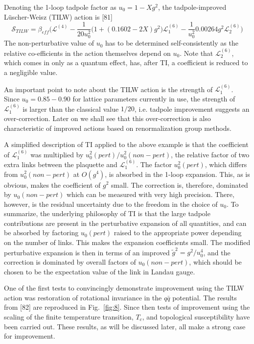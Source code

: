 Denoting the 1-loop tadpole factor as $u_0 = 1 - Xg^2$, the
tadpole-improved L\"uscher-Weisz (TILW) action is [81]
\begin{equation}
\mathcal{S}_{TILW} = \beta_{eff}\bigg(\mathcal{L}^{(4)}
    - \frac{1}{20u_0^2}\big(1 + (0.1602-2X)g^2\big)\mathcal{L}_1^{(6)}
    - \frac{1}{u_0^2}0.00264g^2\mathcal{L}_2^{(6)}\bigg)
\label{eq:LWTIaction}
\end{equation}
The non-perturbative value of $u_0$ has to be determined
self-consistently as the relative co-efficients in the action
themselves depend on $u_0$.  Note that $\mathcal{L}_2^{(6)}$, which
comes in only as a quantum effect, has, after TI, a coefficient is
reduced to a negligible value.

An important point to note about the TILW action is the strength of
$\mathcal{L}_1^{(6)}$.  Since $u_0 = 0.85-0.90$ for lattice parameters
currently in use, the strength of $\mathcal{L}_1^{(6)}$ is larger than
the classical value $1/20$, i.e. tadpole improvement suggests an
over-correction.  Later on we shall see that this over-correction is
also characteristic of improved actions based on renormalization group
methods.

A simplified description of TI applied to the above example is that the
coefficient of $\mathcal{L}_1^{(6)}$ was multiplied by
$u_0^2(pert)/u_0^2(non-pert)$, the relative factor of two extra links
between the plaquette and $\mathcal{L}_1^{(6)}$.  The factor
$u_0^2(pert)$, which differs from $u_0^2(non-pert)$ at $O(g^4)$, is
absorbed in the 1-loop expansion.  This, as is obvious, makes the
coefficient of $g^2$ small.  The correction is, therefore, dominated by
$u_0(non-pert)$ which can be measured with very high precision.  There,
however, is the residual uncertainty due to the freedom in the choice of
$u_0$.  To summarize, the underlying philosophy of TI is that the large
tadpole contributions are present in the perturbative expansion of all
quantities, and can be absorbed by factoring $u_0(pert)$ raised to the
appropriate power depending on the number of links.  This makes the
expansion coefficients small.  The modified perturbative expansion is
then in terms of an improved $\tilde g^2 = g^2/u_0^4$, and the
correction is dominated by overall factors of $u_0(non-pert)$, which
should be chosen to be the expectation value of the link in Landau
gauge.

One of the first tests to convincingly demonstrate improvement using
the TILW action was restoration of rotational invariance in the $q\bar
q$ potential.  The results from [82] are reproduced in Fig.~\ref{fig:8}.
Since then tests of improvement using the scaling of the finite
temperature transition, $T_c$, and topological susceptibility have been
carried out.  These results, as will be discussed later, all make a
strong case for improvement.

